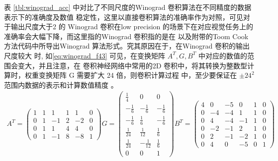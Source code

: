表 \ref{tbl:winograd_acc} 中对比了不同尺度的Winograd 卷积算法在不同精度的数据表示下的准确度及数值
稳定性，这里以直接卷积算法的准确率作为对照，可见对于输出尺度大于2 的 Winograd 卷积在low precision 
的场景下在对应视觉任务上的准确率会大幅下降，而这里指的Winograd 卷积指的是在 \cite{Lavin2015FastAF}
以及附带的Toom Cook 方法代码中所导出Winograd 算法形式。究其原因在于，在Winograd 卷积的输出尺度较大
时, 如\ref{eq:winograd_f43} 可见，在变换矩阵 $A^T, G, B^T$ 中对应的数值的范围会变大，并且注意，在
卷积神经网络中常用的2D 卷积中，将其转换为整数型计算时，权重变换矩阵 G 需要扩大 24 倍，则卷积计算过程
中，至少要保证在 $\pm24^2$ 范围内数据的表示和计算数值精度 。
\begin{align}
\label{eq:winograd_f43}
  A^T = 
  \begin{pmatrix}
      1 & 1 & 1 &  1 &  1 &  0\\
      0 & 1 & -1&  2 &  -2&  0\\
      0 & 1 & 1 &  4 &  4 &  0\\
      0 & 1 & -1&  8 &  -8&  1
  \end{pmatrix}
  G = 
  \begin{pmatrix}
    \frac{1}{4} & 0 & 0 \\
    -\frac{1}{6} & -\frac{1}{6} & -\frac{1}{6} \\
    -\frac{1}{6} & \frac{1}{6} & -\frac{1}{6} \\
    \frac{1}{24} & \frac{1}{12} & \frac{1}{6} \\
    \frac{1}{24} & -\frac{1}{12} & \frac{1}{6} \\
    0 & 0 & 1
  \end{pmatrix}
  B^T =
  \begin{pmatrix}
    4  & 0 &  -5 & 0  &  1&  0\\
    0  & -4&  -4 & 1  &  1&  0\\
    0  & 4 &  -4 & -1 &  1&  0\\
    0  & -2&  -1 & 2  &  1&  0\\
    0  & 2 &  -1 & -2 &  1&  0\\
    0  & 4 &  0  & -5 &  0&  1
  \end{pmatrix}
\end{align}